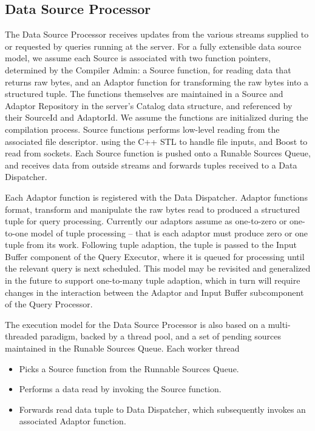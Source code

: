 \documentclass[14pt]{article}
\newcommand{\preliminary}[1]{\textcolor{prelim}{#1}}
\newcommand{\comment}[1]{}
\begin{document}
\comment{
C++ compiler takes file containing C++ code. It builds binary code, loads it in
memory and returns a function handle to it to Admin.
}

\subsection{Data Source Processor}

The Data Source Processor receives updates from the various streams supplied to
or requested by queries running at the server. 
For a fully extensible data source model, we assume each Source is associated
with two function pointers, determined by the Compiler Admin: a Source function,
for reading data that returns raw bytes, and an Adaptor function for
transforming the raw bytes into a structured tuple.
\preliminary{The functions themselves are maintained in a Source and Adaptor
Repository in the server's Catalog data structure, and referenced by their
SourceId and AdaptorId. We assume the functions are initialized during the
compilation process.}
\preliminary{Source functions performs low-level reading from the associated
file descriptor.  using the C++ STL to handle file inputs, and Boost to read
from sockets.}
Each Source function is pushed onto a Runable Sources Queue, and receives data
from outside streams and forwards tuples received to a Data Dispatcher.

Each Adaptor function is registered with the Data Dispatcher. Adaptor functions
format, transform and manipulate the raw bytes read to produced a structured
tuple for query processing. Currently our adaptors assume as one-to-zero or
one-to-one model of tuple processing -- that is each adaptor must produce zero
or one tuple from its work.  Following tuple adaption, the tuple is passed to
the Input Buffer component of the Query Executor, where it is queued for
processing until the relevant query is next scheduled.
\preliminary{This model may be revisited and generalized in the future to
support one-to-many tuple adaption, which in turn will require changes in the
interaction between the Adaptor and Input Buffer subcomponent of the Query
Processor}.

The execution model for the Data Source Processor is also based on a
multi-threaded paradigm, backed by a thread pool, and a set of pending sources
maintained in the Runable Sources Queue. Each worker thread

\begin{itemize}
\item Picks a Source function from the Runnable Sources Queue.
\item Performs a data read by invoking the Source function.
\item Forwards read data tuple to Data Dispatcher, which subsequently invokes an
  associated Adaptor function.
\end{itemize}
\end{document}
